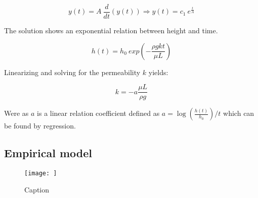 \begin{equation}
    y(t) = A \: \frac{d}{dt}\left( y(t) \right) \Rightarrow y(t) = c_1 \: e^{\frac{t}{A}}
\end{equation}

The solution shows an exponential relation between height and time.

\begin{equation}\label{diff eq solution}
    h(t) = h_0 \: exp\left(-\frac{\rho g k t}{\mu L}\right)
\end{equation}

Linearizing and solving for the permeability $k$ yields:

\begin{equation}\label{lin.diff sol}
    k = -a\frac{\mu L}{\rho g}
\end{equation}

Were as $a$ is a linear relation coefficient defined as $a = \log\left(\frac{h(t)}{h_0}\right) /t$ which can be found by regression.

\subsection{Empirical model}


\begin{figure}
    \centering
    \texttt{[image: ]}
    \caption{Caption}
    \label{fig:my_label}
\end{figure}



